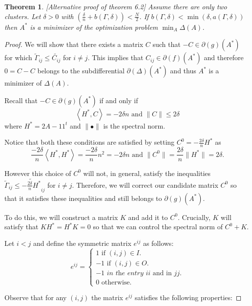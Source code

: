 \documentclass[12pt]{amsart}
\newtheorem{theorem}[lemma]{Theorem}
\theoremstyle{remark}
\begin{document}
\begin{theorem}\label{thm: transport} [Alternative proof of theorem 6.2] Assume there are only two clusters. Let $\delta>0$ with $ \left(\frac{\delta}{n}+b(\Gamma,\delta) \right)  < \frac{N}{2}$. If $b(\Gamma,\delta)< \min(\delta, a(\Gamma,\delta))$ then $A^*$ is a minimizer of the optimization problem $\min_A\Delta(A)$.
\end{theorem} 


\begin{proof}
We will show that there exists a matrix $C $ such that 
$-C \in \partial(g)(A^*) $ for which $\widetilde{\Gamma}_{ij}\leq \widetilde{C_{ij}}$ for $i\neq j$. This implies that $C_{ij} \in \partial(f)(A^*)$ and therefore $0=C-C$ belongs to the subdifferential $\partial(\Delta)(A^*)$ and thus $A^*$ is a minimizer of $\Delta(A)$.

Recall that $-C \in  \partial(g)(A^*) $ if and only if 
\[
\left \langle H^*,C \right \rangle = -2\delta n \text{ and } \|C\| \leq 2\delta
\]
where $H^* = 2A-11^t$ and $\|\bullet\|$ is the spectral norm.

Notice that both these conditions are satisfied by setting
$C^0 = -\frac{2\delta}{n}H^*$ as
\[
 \frac{-2\delta}{n}\left \langle H^*,H^* \right \rangle =  \frac{-2\delta}{n}n^2 = -2\delta n \text{ and } \|C^0\|= \frac{2\delta}{n}\|H^*\|= 2\delta.
\]

However this choice of $C^0$ will not, in general, satisfy the inequalities $\widetilde{\Gamma}_{ij}\leq \widetilde{-\frac{2\delta}{n} H^*}_{ij}$ for $i\neq j$. 
Therefore, we will correct our candidate matrix $C^0$ so that it satisfies these inequalities and still belongs to $\partial(g)(A^*)$.

To do this, we will construct a matrix $K$ and add it to $C^0$. Crucially, $K$ will satisfy that $KH^* = H^*K = 0$ so that we can control the spectral norm of $C^0+K$.

Let $i<j$ and 
define the symmetric matrix  $e^{ij}$ as follows:
\begin{equation}
e^{ij}=\begin{cases}
1 \text{ if }(i,j) \in I. \\
-1 \text{ if }(i,j) \in O. \\
-1 \textit{ in the entry } ii \text{ and in } jj. \\
0 \text{ otherwise}. 
\end{cases}
\end{equation}

Observe that for any $(i,j)$ the matrix $e^{ij}$ satisfies the following  properties:


\end{proof}
\end{document}
